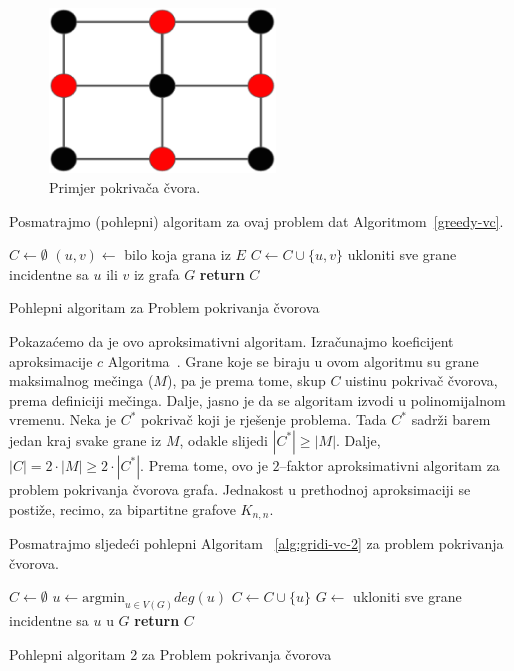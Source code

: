 \documentclass[a4paper, utf8, 11pt, colorlinks]{article}
\begin{document}
  \begin{figure}
  	\centering
  	\includegraphics[width=60mm]{vertex-cover.eps}
  	\caption{Primjer pokrivača čvora.} 
  	\label{vertex-cover}
  \end{figure}
  
  Posmatrajmo (pohlepni) algoritam za ovaj problem dat Algoritmom~\ref{greedy-vc}. 
  
  \begin{algorithm}[H] 
  	\begin{algorithmic}[1]
  		\STATE $C \gets \emptyset$
  		\STATE $(u,v) \gets$ bilo koja grana iz $E$
  		\STATE $C \gets C \cup \{u,v\}$
  		\STATE ukloniti sve grane incidentne sa  $u$ ili $v$ iz grafa $G$
  		\ENDWHILE
  		\STATE \textbf{return} $C$
  	\end{algorithmic}
     \caption{Pohlepni algoritam za Problem pokrivanja čvorova}
     \label{alg:gridi-vc}
  \end{algorithm}
  
  \noindent Pokazaćemo da je ovo aproksimativni algoritam. Izračunajmo koeficijent aproksimacije $c$  Algoritma~\label{alg:gridi-vc}.
  Grane koje se biraju u ovom algoritmu su grane maksimalnog mečinga ($M$), pa je prema tome, skup $C$ uistinu pokrivač čvorova, prema definiciji mečinga. Dalje, jasno je da se algoritam izvodi u polinomijalnom vremenu. Neka je $C^*$ pokrivač koji je rješenje problema. Tada $C^*$ sadrži barem jedan kraj svake grane iz $M$, odakle slijedi $|C^*|\geq |M|$. Dalje, $|C|= 2 \cdot |M| \geq 2 \cdot |C^*|$. Prema tome, ovo je $2$--faktor aproksimativni algoritam za problem pokrivanja čvorova grafa. Jednakost u prethodnoj aproksimaciji se postiže, recimo, za bipartitne grafove $K_{n,n}$. 
  
  Posmatrajmo sljedeći pohlepni Algoritam ~\ref{alg:gridi-vc-2} za problem pokrivanja čvorova.  
  
  \begin{algorithm}[H] 
  	\begin{algorithmic}[1]
  		\STATE $C \gets \emptyset$
  		\STATE  $u \gets \textrm{argmin}_{u \in V(G)} deg(u)$
  		\STATE  $C \gets C \cup \{u\}$
  		\STATE $G \gets$ ukloniti sve grane incidentne sa $u$ u $G$  
  		\ENDWHILE
  		\STATE \textbf{return} $C$
  	\end{algorithmic}
     	\caption{Pohlepni algoritam 2 za Problem pokrivanja čvorova}
        \label{alg:gridi-vc-2}
  \end{algorithm}
  
\end{document}
